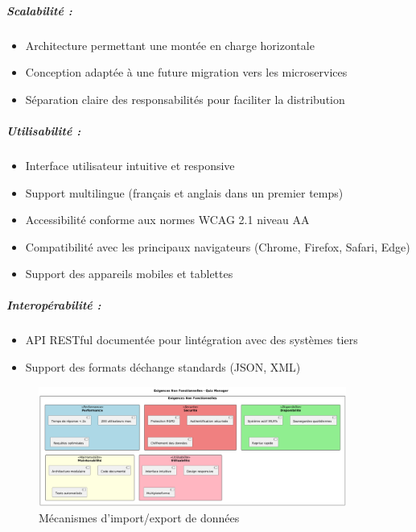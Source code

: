 \documentclass[12pt,a4paper,twoside]{report}
\begin{document}
\hypertarget{scalabilituxe9}{%
\subparagraph{Scalabilité :}\label{scalabilituxe9}}

\begin{itemize}
\item
  Architecture permettant une montée en charge horizontale
\item
  Conception adaptée à une future migration vers les microservices
\item
  Séparation claire des responsabilités pour faciliter la distribution
\end{itemize}

\hypertarget{utilisabilituxe9}{%
\subparagraph{Utilisabilité :}\label{utilisabilituxe9}}

\begin{itemize}
\item
  Interface utilisateur intuitive et responsive
\item
  Support multilingue (français et anglais dans un premier temps)
\item
  Accessibilité conforme aux normes WCAG 2.1 niveau AA
\item
  Compatibilité avec les principaux navigateurs (Chrome, Firefox,
  Safari, Edge)
\item
  Support des appareils mobiles et tablettes
\end{itemize}

\hypertarget{interopuxe9rabilituxe9}{%
\subparagraph{Interopérabilité :}\label{interopuxe9rabilituxe9}}

\begin{itemize}
\item
  API RESTful documentée pour l\textquotesingle intégration avec des
  systèmes tiers
\item
  Support des formats d\textquotesingle échange standards (JSON, XML)
\end{itemize}

\begin{figure}[H]
\centering
\includegraphics[width=0.9\textwidth]{latex_media/media/image12.png}
\caption{Mécanismes d'import/export de données}
\label{fig:import-export-donnees}
\end{figure}
\end{document}
